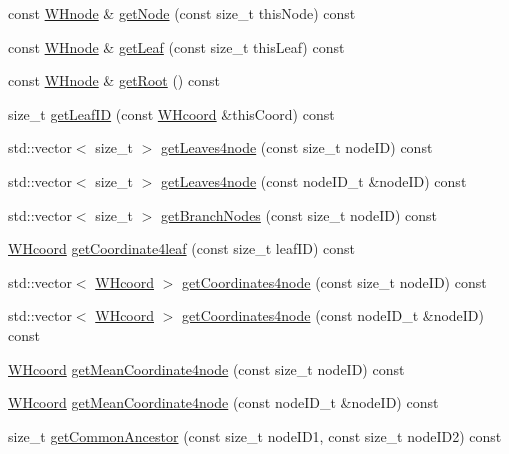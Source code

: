 \begin{DoxyCompactItemize}
const \hyperlink{classWHnode}{\-W\-Hnode} \& \hyperlink{classWHtree_a58a274bacff561739374ed95ed74488f}{get\-Node} (const size\-\_\-t this\-Node) const 
\item 
const \hyperlink{classWHnode}{\-W\-Hnode} \& \hyperlink{classWHtree_adc212da2ed903705afac40d96975cc7e}{get\-Leaf} (const size\-\_\-t this\-Leaf) const 
\item 
const \hyperlink{classWHnode}{\-W\-Hnode} \& \hyperlink{classWHtree_a53a4524bb216e0d320fdb5c98ec2c717}{get\-Root} () const 
\item 
size\-\_\-t \hyperlink{classWHtree_a335e5ee61ee857d9da6fbd960393c109}{get\-Leaf\-I\-D} (const \hyperlink{classWHcoord}{\-W\-Hcoord} \&this\-Coord) const 
\item 
std\-::vector$<$ size\-\_\-t $>$ \hyperlink{classWHtree_a0f9a23021c60b6bc72839852d51e4203}{get\-Leaves4node} (const size\-\_\-t node\-I\-D) const 
\item 
std\-::vector$<$ size\-\_\-t $>$ \hyperlink{classWHtree_a0768aa45b66453ef9689ce9b27a11038}{get\-Leaves4node} (const node\-I\-D\-\_\-t \&node\-I\-D) const 
\item 
std\-::vector$<$ size\-\_\-t $>$ \hyperlink{classWHtree_a50bc334e9b71cdc3c9821c5decad58b5}{get\-Branch\-Nodes} (const size\-\_\-t node\-I\-D) const 
\item 
\hyperlink{classWHcoord}{\-W\-Hcoord} \hyperlink{classWHtree_a8550437c85a1c9d8ff5726e45044eef1}{get\-Coordinate4leaf} (const size\-\_\-t leaf\-I\-D) const 
\item 
std\-::vector$<$ \hyperlink{classWHcoord}{\-W\-Hcoord} $>$ \hyperlink{classWHtree_af31b8dd9b39669b0969b5d06390652dc}{get\-Coordinates4node} (const size\-\_\-t node\-I\-D) const 
\item 
std\-::vector$<$ \hyperlink{classWHcoord}{\-W\-Hcoord} $>$ \hyperlink{classWHtree_abefe13898e516410826ec105c1af211e}{get\-Coordinates4node} (const node\-I\-D\-\_\-t \&node\-I\-D) const 
\item 
\hyperlink{classWHcoord}{\-W\-Hcoord} \hyperlink{classWHtree_ae17b1e3c712515baf55ac5ba4cdb0e29}{get\-Mean\-Coordinate4node} (const size\-\_\-t node\-I\-D) const 
\item 
\hyperlink{classWHcoord}{\-W\-Hcoord} \hyperlink{classWHtree_a211df0613a8e94addb903df8217b4b16}{get\-Mean\-Coordinate4node} (const node\-I\-D\-\_\-t \&node\-I\-D) const 
\item 
size\-\_\-t \hyperlink{classWHtree_a4dc2606d76140ba2e47e8d336dc0ef06}{get\-Common\-Ancestor} (const size\-\_\-t node\-I\-D1, const size\-\_\-t node\-I\-D2) const 

\end{DoxyCompactItemize}
